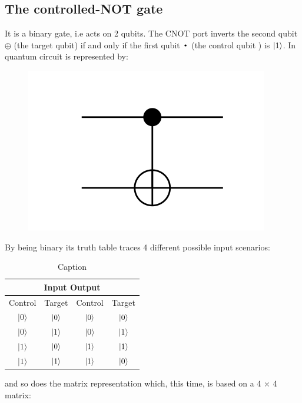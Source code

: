 \subsection*{The controlled-NOT gate}
It is a binary gate, i.e acts on 2 qubits. The CNOT port inverts the second qubit $\oplus$ (the target qubit) if and only if the first qubit $\Bigcdot$ (the control qubit ) is $\ket{1}$. In quantum circuit is represented by: 
\begin{figure}[H]
\centering
\includegraphics{Mainmatter/images/CNOT_gate.png}
\end{figure}
By being binary its truth table traces 4 different possible input scenarios: 
\begin{table}[h!]
    \centering
    \begin{tabular}{cc|cc}
    \hline
    \multicolumn{4}{c}{Input \quad \quad \quad \quad  \quad     Output } \\
    \hline Control& Target & Control & Target\\
\hline$|0\rangle$ & $\ket{0}$ & $\ket{0}$&$\ket{0}$\\
$|0\rangle$ & $|1\rangle$ &$|0\rangle$ & $|1\rangle$ \\
$|1\rangle$ & $\ket{0}$ & $\ket{1}$&$\ket{1}$ \\
$|1\rangle$ & $\ket{1}$ & $\ket{1}$&$\ket{0}$\\
\hline
\end{tabular}
    \caption{Caption}
    \label{tab:my_label}
\end{table}
and so does the matrix representation which, this time, is based on a 4 × 4 matrix: 

